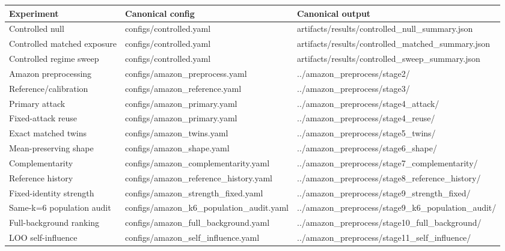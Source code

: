 \begin{tabular}{lll}
\toprule
Experiment & Canonical config & Canonical output \\
\midrule
Controlled null & configs/controlled.yaml & artifacts/results/controlled_null_summary.json \\
Controlled matched exposure & configs/controlled.yaml & artifacts/results/controlled_matched_summary.json \\
Controlled regime sweep & configs/controlled.yaml & artifacts/results/controlled_sweep_summary.json \\
Amazon preprocessing & configs/amazon_preprocess.yaml & ../amazon_preprocess/stage2/ \\
Reference/calibration & configs/amazon_reference.yaml & ../amazon_preprocess/stage3/ \\
Primary attack & configs/amazon_primary.yaml & ../amazon_preprocess/stage4_attack/ \\
Fixed-attack reuse & configs/amazon_primary.yaml & ../amazon_preprocess/stage4_reuse/ \\
Exact matched twins & configs/amazon_twins.yaml & ../amazon_preprocess/stage5_twins/ \\
Mean-preserving shape & configs/amazon_shape.yaml & ../amazon_preprocess/stage6_shape/ \\
Complementarity & configs/amazon_complementarity.yaml & ../amazon_preprocess/stage7_complementarity/ \\
Reference history & configs/amazon_reference_history.yaml & ../amazon_preprocess/stage8_reference_history/ \\
Fixed-identity strength & configs/amazon_strength_fixed.yaml & ../amazon_preprocess/stage9_strength_fixed/ \\
Same-k=6 population audit & configs/amazon_k6_population_audit.yaml & ../amazon_preprocess/stage9_k6_population_audit/ \\
Full-background ranking & configs/amazon_full_background.yaml & ../amazon_preprocess/stage10_full_background/ \\
LOO self-influence & configs/amazon_self_influence.yaml & ../amazon_preprocess/stage11_self_influence/ \\
\bottomrule
\end{tabular}
